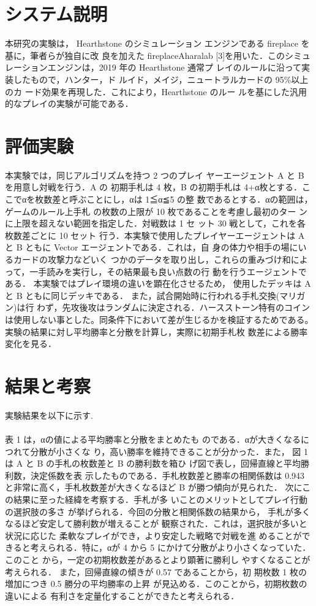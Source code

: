 \documentclass[twocolumn]{ltjsarticle}
\begin{document}
\section{システム説明}
\small{
  本研究の実験は， Hearthstone のシミュレーション
エンジンである fireplace を基に，筆者らが独自に改
良を加えた fireplaceAharalab [3]を用いた．このシミュ
レーションエンジンは，2019 年の Hearthstone 通常プ
レイのルールに沿って実装したもので，ハンター，ド
ルイド，メイジ，ニュートラルカードの 95\%以上のカ
ード効果を再現した．これにより，Hearthstone のルー
ルを基にした汎用的なプレイの実験が可能である．
}
\section{評価実験}
\small{
  本実験では，同じアルゴリズムを持つ 2 つのプレイ
ヤーエージェント A と B を用意し対戦を行う．A の
初期手札は 4 枚，B の初期手札は 4+α枚とする．こ
こでαを枚数差と呼ぶことにし，αは 1≦α≦5 の整
数であるとする．αの範囲は，ゲームのルール上手札
の枚数の上限が 10 枚であることを考慮し最初のター
ンに上限を超えない範囲を指定した．対戦数は 1 セ
ット 30 戦として，これを各枚数差ごとに 10 セット
行う．本実験で使用したプレイヤーエージェントは A
と B ともに Vector エージェントである．これは，自
身の体力や相手の場にいるカードの攻撃力などいく
つかのデータを取り出し，これらの重みづけ和によ
って，一手読みを実行し，その結果最も良い点数の行
動を行うエージェントである．
本実験ではプレイ環境の違いを顕在化させるため，
使用したデッキは A と B ともに同じデッキである．
また，試合開始時に行われる手札交換(マリガン)は行
わず，先攻後攻はランダムに決定される．ハースストーン特有のコインは使用しない事とした。同条件下において差が生じるかを検証するためである。
実験の結果に対し平均勝率と分散を計算し，実際に初期手札枚
数差による勝率変化を見る．
}
\section{結果と考察}
\small{
  実験結果を以下に示す.
}
\\%
\\
\small{
  表 1 は，αの値による平均勝率と分散をまとめたも
のである．αが大きくなるにつれて分散が小さくな
り，高い勝率を維持できることが分かった．また，
図 1 は A と B の手札の枚数差と B の勝利数を箱ひ
げ図で表し，回帰直線と平均勝利数，決定係数を表
示したものである．手札枚数差と勝率の相関係数は
0.943 と非常に高く，手札枚数差が大きくなるほど B
が勝つ傾向が見られた．
次にこの結果に至った経緯を考察する．手札が多
いことのメリットとしてプレイ行動の選択肢の多さ
が挙げられる．今回の分散と相関係数の結果から，
手札が多くなるほど安定して勝利数が増えることが
観察された．これは，選択肢が多いと状況に応じた
柔軟なプレイができ，より安定した戦略で対戦を進
めることができると考えられる．特に，αが 4 から
5 にかけて分散がより小さくなっていた．このこと
から，一定の初期枚数差があるとより顕著に勝利し
やすくなることが考えられる．
また，回帰直線の傾きが 0.57 であることから，初
期枚数 1 枚の増加につき 0.5 勝分の平均勝率の上昇
が見込める．このことから，初期枚数の違いによる
有利さを定量化することができたと考えられる．
}
\end{document}
